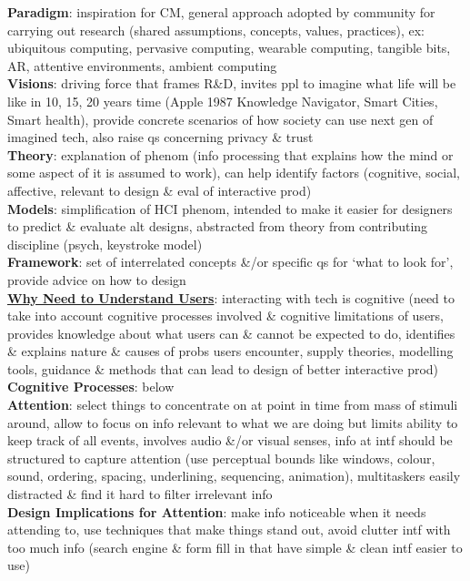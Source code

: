 \documentclass[a4paper]{article}
\begin{document}
\begin{multicols}{3}
        \textbf{Paradigm}: inspiration for CM, general approach adopted by community for carrying out research (shared assumptions, concepts, values, practices), ex: ubiquitous computing, pervasive computing, wearable computing, tangible bits, AR, attentive environments, ambient computing\\
        \textbf{Visions}: driving force that frames R\&D, invites ppl to imagine what life will be like in 10, 15, 20 years time (Apple 1987 Knowledge Navigator, Smart Cities, Smart health), provide concrete scenarios of how society can use next gen of imagined tech, also  raise qs concerning privacy \& trust\\
        \textbf{Theory}: explanation of phenom (info processing that explains how the mind or some aspect of it is assumed to work), can help identify factors (cognitive, social, affective, relevant to design \& eval of interactive prod)\\
        \textbf{Models}: simplification of HCI phenom, intended to make it easier for designers to predict \& evaluate alt designs, abstracted from theory from contributing discipline (psych, keystroke model)\\
        \textbf{Framework}: set of interrelated concepts \&/or specific qs for `what to look for', provide advice on how to design\\
        \underline{\textbf{Why Need to Understand Users}}: interacting with tech is cognitive (need to take into account cognitive processes involved \& cognitive limitations of users, provides knowledge about what users can \& cannot be expected to do, identifies \& explains nature \& causes of probs users encounter, supply theories, modelling tools, guidance \& methods that can lead to design of better interactive prod)\\
        \textbf{Cognitive Processes}: below\\
        \textbf{Attention}: select things to concentrate on at point in time from mass of stimuli around, allow to focus on info relevant to what we are doing but limits ability to keep track of all events, involves audio \&/or visual senses, info at intf should be structured to capture attention (use perceptual bounds like windows, colour, sound, ordering, spacing, underlining, sequencing, animation), multitaskers easily distracted \& find it hard to filter irrelevant info\\
        \textbf{Design Implications for Attention}: make info noticeable when it needs attending to, use techniques that make things stand out, avoid clutter intf with too much info (search engine \& form fill in that have simple \& clean intf easier to use)\\

\end{multicols}
\end{document}
